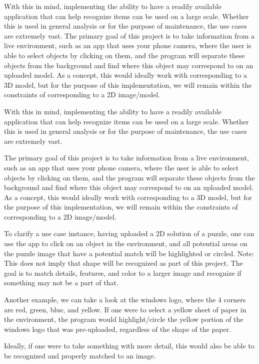 \documentclass[letter,10pt]{article}
\begin{document}
\begin{multicols}{2}
            With this in mind, implementing the ability to have a readily available application that can help recognize items can be used on a large scale. Whether this is used in general analysis or for the purpose of maintenance, the use cases are extremely vast.
            The primary goal of this project is to take information from a live environment, such as an app that uses your phone camera, where the user is able to select objects by clicking on them, and the program will separate these objects from the background and find where this object may correspond to on an uploaded model. As a concept, this would ideally work with corresponding to a 3D model, but for the purpose of this implementation, we will remain within the constraints of corresponding to a 2D image/model. 
		\par
		With this in mind, implementing the ability to have a readily available application that can help recognize items can be used on a large scale. Whether this is used in general analysis or for the purpose of maintenance, the use cases are extremely vast.
        \par
        The primary goal of this project is to take information from a live environment, such as an app that uses your phone camera, where the user is able to select objects by clicking on them, and the program will separate these objects from the background and find where this object may correspond to on an uploaded model. As a concept, this would ideally work with corresponding to a 3D model, but for the purpose of this implementation, we will remain within the constraints of corresponding to a 2D image/model.
        \par
        To clarify a use case instance, having uploaded a 2D solution of a puzzle, one can use the app to click on an object in the environment, and all potential areas on the puzzle image that have a potential match will be highlighted or circled. Note: This does not imply that shape will be recognized as part of this project. The goal is to match details, features, and color to a larger image and recognize if something may not be a part of that.
        \par
        Another example, we can take a look at the windows logo, where the 4 corners are red, green, blue, and yellow. If one were to select a yellow sheet of paper in the environment, the program would highlight/circle the yellow portion of the windows logo that was pre-uploaded, regardless of the shape of the paper.
        \par
        Ideally, if one were to take something with more detail, this would also be able to be recognized and properly matched to an image.
        

\end{multicols}
\end{document}
